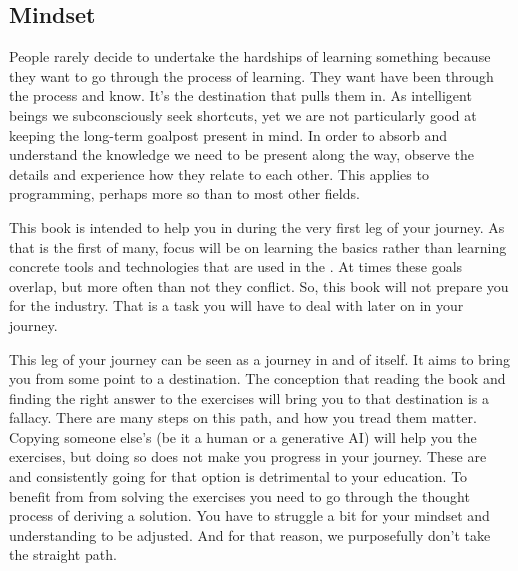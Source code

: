 \subsection{Mindset}

\begin{inspiration}{\cite{selfrel}}
\end{inspiration}

People rarely decide to undertake the hardships of learning something because they want to go through the process of learning. They want have been through the process and know. It's the destination that pulls them in. As intelligent beings we subconsciously seek shortcuts, yet we are not particularly good at keeping the long-term goalpost present in mind. In order to absorb and understand the knowledge we need to be present along the way, observe the details and experience how they relate to each other. This applies to programming, perhaps more so than to most other fields.

This book is intended to help you in during the very first leg of your journey. As that is the first of many, focus will be on learning the basics rather than learning concrete tools and technologies that are used in the . At times these goals overlap, but more often than not they conflict. So, this book will not prepare you for the industry. That is a task you will have to deal with later on in your journey.

This leg of your journey can be seen as a journey in and of itself. It aims to bring you from some point to a destination. The conception that reading the book and finding the right answer to the exercises will bring you to that destination is a fallacy. There are many steps on this path, and how you tread them matter.
Copying someone else's  (be it a human or a generative AI) will help you  the exercises, but doing so does not make you progress in your journey. These are  and consistently going for that option is detrimental to your education. To benefit from from solving the exercises you need to go through the thought process of deriving a solution. You have to struggle a bit for your mindset and understanding to be adjusted. And for that reason, we purposefully don't take the straight path.

